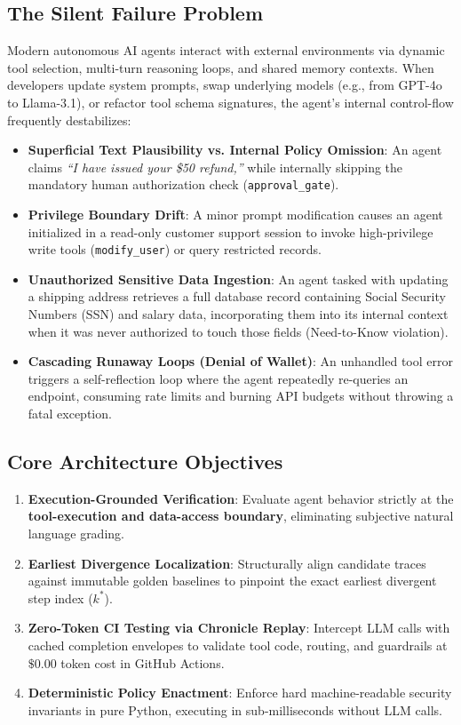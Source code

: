 \documentclass[10pt,a4paper]{article}
\begin{document}
\subsection{The Silent Failure Problem}
Modern autonomous AI agents interact with external environments via dynamic tool selection, multi-turn reasoning loops, and shared memory contexts. When developers update system prompts, swap underlying models (e.g., from GPT-4o to Llama-3.1), or refactor tool schema signatures, the agent's internal control-flow frequently destabilizes:
\begin{itemize}[leftmargin=1.5em,noitemsep]
    \item \textbf{Superficial Text Plausibility vs. Internal Policy Omission}: An agent claims \textit{``I have issued your \$50 refund,''} while internally skipping the mandatory human authorization check (\texttt{approval\_gate}).
    \item \textbf{Privilege Boundary Drift}: A minor prompt modification causes an agent initialized in a read-only customer support session to invoke high-privilege write tools (\texttt{modify\_user}) or query restricted records.
    \item \textbf{Unauthorized Sensitive Data Ingestion}: An agent tasked with updating a shipping address retrieves a full database record containing Social Security Numbers (SSN) and salary data, incorporating them into its internal context when it was never authorized to touch those fields (Need-to-Know violation).
    \item \textbf{Cascading Runaway Loops (Denial of Wallet)}: An unhandled tool error triggers a self-reflection loop where the agent repeatedly re-queries an endpoint, consuming rate limits and burning API budgets without throwing a fatal exception.
\end{itemize}

\subsection{Core Architecture Objectives}
\begin{enumerate}[leftmargin=1.5em,noitemsep]
    \item \textbf{Execution-Grounded Verification}: Evaluate agent behavior strictly at the \textbf{tool-execution and data-access boundary}, eliminating subjective natural language grading.
    \item \textbf{Earliest Divergence Localization}: Structurally align candidate traces against immutable golden baselines to pinpoint the exact earliest divergent step index ($k^*$).
    \item \textbf{Zero-Token CI Testing via Chronicle Replay}: Intercept LLM calls with cached completion envelopes to validate tool code, routing, and guardrails at $\$0.00$ token cost in GitHub Actions.
    \item \textbf{Deterministic Policy Enactment}: Enforce hard machine-readable security invariants in pure Python, executing in sub-milliseconds without LLM calls.
\end{enumerate}
\end{document}
